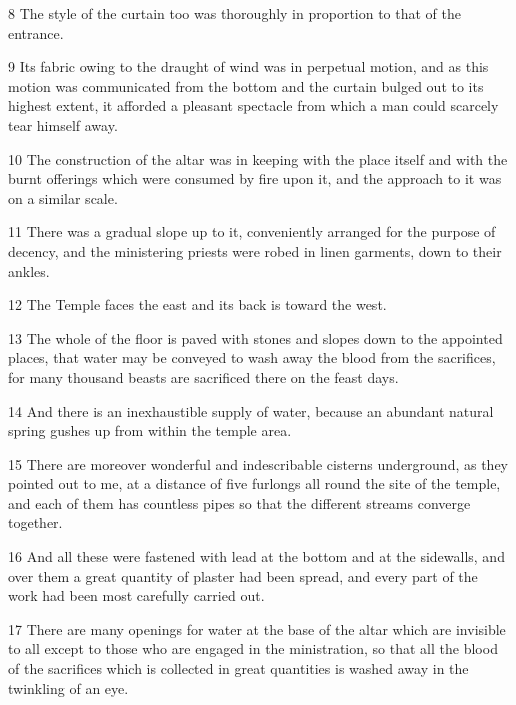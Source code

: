 \par 8 The style of the curtain too was thoroughly in proportion to that of the entrance.

\par 9 Its fabric owing to the draught of wind was in perpetual motion, and as this motion was communicated from the bottom and the curtain bulged out to its highest extent, it afforded a pleasant spectacle from which a man could scarcely tear himself away.

\par 10 The construction of the altar was in keeping with the place itself and with the burnt offerings which were consumed by fire upon it, and the approach to it was on a similar scale.

\par 11 There was a gradual slope up to it, conveniently arranged for the purpose of decency, and the ministering priests were robed in linen garments, down to their ankles.

\par 12 The Temple faces the east and its back is toward the west.

\par 13 The whole of the floor is paved with stones and slopes down to the appointed places, that water may be conveyed to wash away the blood from the sacrifices, for many thousand beasts are sacrificed there on the feast days.

\par 14 And there is an inexhaustible supply of water, because an abundant natural spring gushes up from within the temple area.

\par 15 There are moreover wonderful and indescribable cisterns underground, as they pointed out to me, at a distance of five furlongs all round the site of the temple, and each of them has countless pipes so that the different streams converge together.

\par 16 And all these were fastened with lead at the bottom and at the sidewalls, and over them a great quantity of plaster had been spread, and every part of the work had been most carefully carried out.

\par 17 There are many openings for water at the base of the altar which are invisible to all except to those who are engaged in the ministration, so that all the blood of the sacrifices which is collected in great quantities is washed away in the twinkling of an eye.

